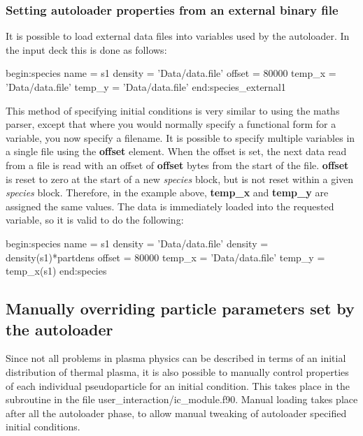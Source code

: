 \subsubsection{Setting autoloader properties from an external binary file}
It is possible to load external data files into variables used by the
autoloader. In the input deck this is done as follows:
\begin{boxverbatim}
begin:species
   name = s1
   density = 'Data/data.file'
   offset = 80000
   temp_x = 'Data/data.file'
   temp_y = 'Data/data.file'
end:species_external1
\end{boxverbatim}

This method of specifying initial conditions is very similar to using the
maths parser, except that
where you would normally specify a functional form for a variable, you now
specify a filename.  It is possible to specify
multiple variables in a single file using the {\bf offset} element. When the
offset is set, the next data read from a file is read with an offset of {\bf
offset} bytes from the start of the file. {\bf offset} is reset to zero at the
start of a new {\it species} block, but is not reset within a given
{\it species} block. Therefore, in the example above, {\bf temp\_x}
and {\bf temp\_y} are assigned the same values. The data is immediately loaded
into the requested variable, so it is valid to do the following:
\begin{boxverbatim}
begin:species
   name = s1
   density = 'Data/data.file'
   density = density(s1)*partdens
   offset = 80000
   temp_x = 'Data/data.file'
   temp_y = temp_x(s1)
end:species
\end{boxverbatim}


\subsection{Manually overriding particle parameters set by the autoloader}
\label{sec:manualload}

Since not all problems in plasma physics can be described in terms of an
initial distribution of thermal plasma, it is also possible to manually
control properties of each individual pseudoparticle for an initial
condition. This takes place in the subroutine  in the
file user\_interaction/ic\_module.f90. Manual loading takes place after
all the autoloader phase, to allow manual tweaking of autoloader specified
initial conditions.

